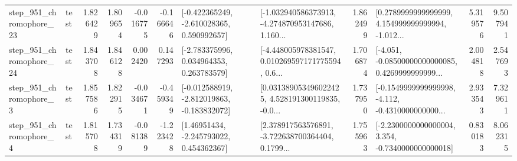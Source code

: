 \begin{tabular}{llrrrrllrlrr}
  step\_951\_chromophore\_23 &      test &      1.826429 &    1.809654 &     -0.016775 & -0.166646 &   [-0.422365249, -2.610028365, 0.590992657] &  [-1.032940586373913, -4.274870953147686, 1.160... &       1.862499 &  [0.2789999999999999, 4.154999999999994, -1.012... &            5.319576 &          9.507941 \\
  step\_951\_chromophore\_24 &      test &      1.843708 &    1.846128 &      0.002420 &  0.147293 &    [-2.783375996, 0.034964353, 0.263783579] &  [-4.448005978381547, 0.010269597171775594, 0.6... &       1.706874 &  [-4.051, -0.08500000000000085, 0.4269999999999... &            2.004818 &          2.547693 \\
   step\_951\_chromophore\_3 &      test &      1.857586 &    1.822915 &     -0.034671 & -0.459349 &  [-0.012588919, -2.812019863, -0.183832072] &  [0.031389053496022425, 4.528191300119835, -0.0... &       1.737950 &  [-0.1549999999999998, -4.112, -0.4310000000000... &            2.933543 &          7.329611 \\
   step\_951\_chromophore\_4 &      test &      1.815708 &    1.734319 &     -0.081389 & -1.223428 &     [1.46951434, -2.245793022, 0.454362367] &  [2.378917563576891, -3.722638700364404, 0.1799... &       1.755963 &  [-2.2300000000000004, 3.354, -0.7340000000000018] &            0.830183 &          8.062315 \\
\bottomrule
\end{tabular}

